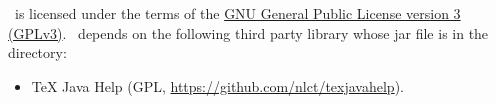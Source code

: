 %
\FlowframTk\ is licensed under the terms of the 
\href{https://www.gnu.org/licenses/gpl-3.0.html}{GNU General
Public License version 3 (GPLv3)}.
\FlowframTk\ depends on the following third party library whose
jar file is in the  directory:
\begin{itemize}
   \item TeX Java Help 
   (GPL, \url{https://github.com/nlct/texjavahelp}).
\end{itemize}



\printmain
\printindex 

 

